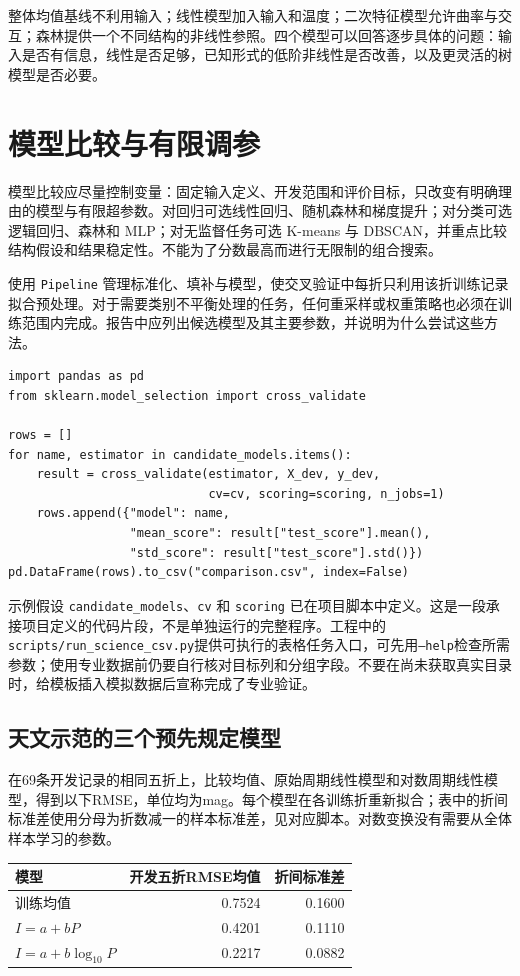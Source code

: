整体均值基线不利用输入；线性模型加入输入和温度；二次特征模型允许曲率与交互；森林提供一个不同结构的非线性参照。四个模型可以回答逐步具体的问题：输入是否有信息，线性是否足够，已知形式的低阶非线性是否改善，以及更灵活的树模型是否必要。

\section{模型比较与有限调参}
模型比较应尽量控制变量：固定输入定义、开发范围和评价目标，只改变有明确理由的模型与有限超参数。对回归可选线性回归、随机森林和梯度提升；对分类可选逻辑回归、森林和 MLP；对无监督任务可选 K-means 与 DBSCAN，并重点比较结构假设和结果稳定性。不能为了分数最高而进行无限制的组合搜索。

使用 \texttt{Pipeline} 管理标准化、填补与模型，使交叉验证中每折只利用该折训练记录拟合预处理。对于需要类别不平衡处理的任务，任何重采样或权重策略也必须在训练范围内完成。报告中应列出候选模型及其主要参数，并说明为什么尝试这些方法。

\begin{lstlisting}[caption={综合项目中保存统一模型比较记录的示例}]
import pandas as pd
from sklearn.model_selection import cross_validate

rows = []
for name, estimator in candidate_models.items():
    result = cross_validate(estimator, X_dev, y_dev,
                            cv=cv, scoring=scoring, n_jobs=1)
    rows.append({"model": name,
                 "mean_score": result["test_score"].mean(),
                 "std_score": result["test_score"].std()})
pd.DataFrame(rows).to_csv("comparison.csv", index=False)
\end{lstlisting}

示例假设 \texttt{candidate\_models}、\texttt{cv} 和 \texttt{scoring} 已在项目脚本中定义。这是一段承接项目定义的代码片段，不是单独运行的完整程序。工程中的\texttt{scripts/run\_science\_csv.py}提供可执行的表格任务入口，可先用\texttt{--help}检查所需参数；使用专业数据前仍要自行核对目标列和分组字段。不要在尚未获取真实目录时，给模板插入模拟数据后宣称完成了专业验证。

\subsection{天文示范的三个预先规定模型}
在69条开发记录的相同五折上，比较均值、原始周期线性模型和对数周期线性模型，得到以下RMSE，单位均为mag。每个模型在各训练折重新拟合；表中的折间标准差使用分母为折数减一的样本标准差，见对应脚本。对数变换没有需要从全体样本学习的参数。
\begin{center}\small
\begin{tabular}{lrr}\toprule
模型&开发五折RMSE均值&折间标准差\\\midrule
训练均值&0.7524&0.1600\\
$I=a+bP$&0.4201&0.1110\\
$I=a+b\log_{10}P$&0.2217&0.0882\\\bottomrule
\end{tabular}\end{center}

